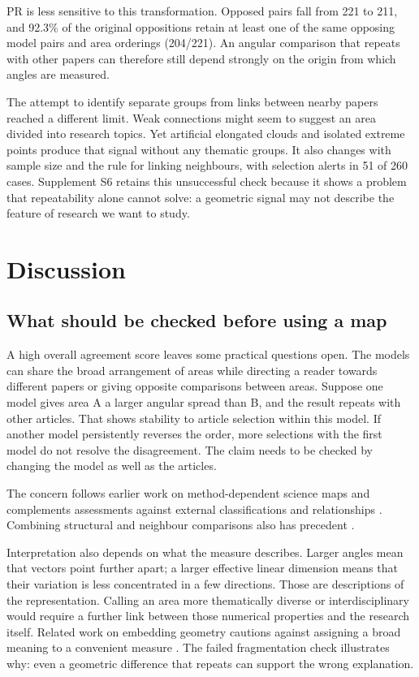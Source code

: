 \documentclass[12pt]{article}
\begin{document}
PR is less sensitive to this transformation. Opposed pairs fall from 221 to 211, and 92.3\% of the original oppositions retain at least one of the same opposing model pairs and area orderings (204/221). An angular comparison that repeats with other papers can therefore still depend strongly on the origin from which angles are measured.

The attempt to identify separate groups from links between nearby papers reached a different limit. Weak connections might seem to suggest an area divided into research topics. Yet artificial elongated clouds and isolated extreme points produce that signal without any thematic groups. It also changes with sample size and the rule for linking neighbours, with selection alerts in 51 of 260 cases. Supplement S6 retains this unsuccessful check because it shows a problem that repeatability alone cannot solve: a geometric signal may not describe the feature of research we want to study.

\FloatBarrier
\section{Discussion}
\subsection{What should be checked before using a map}
A high overall agreement score leaves some practical questions open. The models can share the broad arrangement of areas while directing a reader towards different papers or giving opposite comparisons between areas. Suppose one model gives area A a larger angular spread than B, and the result repeats with other articles. That shows stability to article selection within this model. If another model persistently reverses the order, more selections with the first model do not resolve the disagreement. The claim needs to be checked by changing the model as well as the articles.

The concern follows earlier work on method-dependent science maps \citep{refa0d2d707e6,ref6a2f5912bc} and complements assessments against external classifications and relationships \citep{refbe130e2973,refc0e2cc29e0}. Combining structural and neighbour comparisons also has precedent \citep{ref4e1e0d5582}.

Interpretation also depends on what the measure describes. Larger angles mean that vectors point further apart; a larger effective linear dimension means that their variation is less concentrated in a few directions. Those are descriptions of the representation. Calling an area more thematically diverse or interdisciplinary would require a further link between those numerical properties and the research itself. Related work on embedding geometry cautions against assigning a broad meaning to a convenient measure \citep{rudman-etal-2022-isoscore}. The failed fragmentation check illustrates why: even a geometric difference that repeats can support the wrong explanation.
\end{document}
